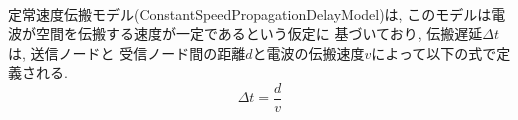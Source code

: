 \\
\indent 定常速度伝搬モデル(ConstantSpeedPropagationDelayModel)は, 
このモデルは電波が空間を伝搬する速度が一定であるという仮定に
基づいており, 伝搬遅延$\Delta t$は, 送信ノードと
受信ノード間の距離$d$と電波の伝搬速度$v$によって以下の式で定義される.
\[
  \Delta t = \frac{d}{v}
\]
